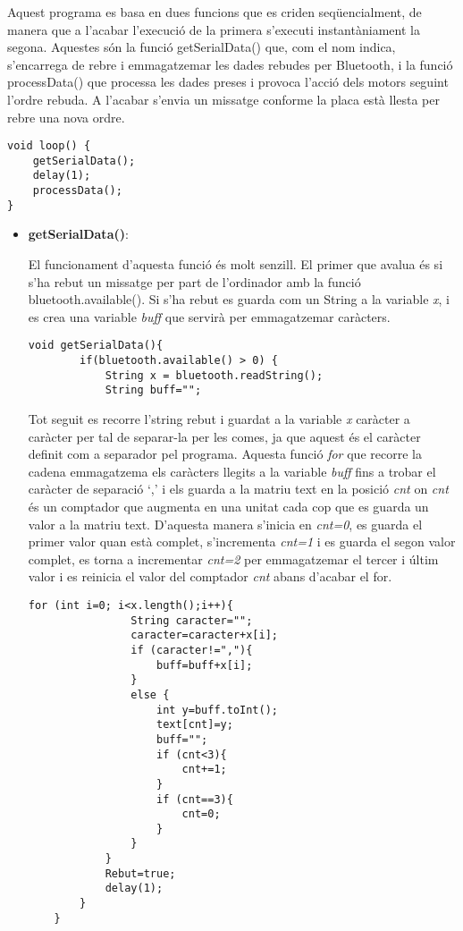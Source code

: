 Aquest programa es basa en dues funcions que es criden seqüencialment, de manera que a l'acabar l’execució de la primera s’executi instantàniament la segona. Aquestes són la funció getSerialData() que, com el nom indica, s’encarrega de rebre i emmagatzemar les dades rebudes per Bluetooth, i la funció processData() que processa les dades preses i provoca l’acció dels motors seguint l’ordre rebuda. A l'acabar s’envia un missatge conforme la placa està llesta per rebre una nova ordre. 
\begin{lstlisting}[style=Arduino]
void loop() {
	getSerialData();
	delay(1);
	processData();
}
\end{lstlisting}
\begin{itemize}
	\item \textbf{getSerialData()}:
	
	El funcionament d’aquesta funció és molt senzill. El primer que avalua és si s’ha rebut un missatge per part de l’ordinador amb la funció bluetooth.available(). Si s’ha rebut es guarda com un String a la variable \emph{x}, i es crea una variable \emph{buff} que servirà per emmagatzemar caràcters. 
	
	\begin{lstlisting}[style=Arduino]
	void getSerialData(){
		if(bluetooth.available() > 0) {
			String x = bluetooth.readString();
			String buff="";
	\end{lstlisting}
	
	Tot seguit es recorre l’string rebut i guardat a la variable \emph{x} caràcter a caràcter per tal de separar-la per les comes, ja que aquest és el caràcter definit com a separador pel programa. Aquesta funció \emph{for} que recorre la cadena emmagatzema els caràcters llegits a la variable \emph{buff} fins a trobar el caràcter de separació ‘,’ i els guarda a la matriu text en la posició \emph{cnt} on \emph{cnt} és un comptador que augmenta en una unitat cada cop que es guarda un valor a la matriu text. D’aquesta manera s’inicia en \emph{cnt=0}, es guarda el primer valor quan està complet, s’incrementa \emph{cnt=1} i es guarda el segon valor complet, es torna a incrementar \emph{cnt=2} per emmagatzemar el tercer i últim valor i es reinicia el valor del comptador \emph{cnt} abans d’acabar el for. 
	
	\begin{lstlisting}[style=Arduino]
			for (int i=0; i<x.length();i++){
				String caracter="";
				caracter=caracter+x[i];
				if (caracter!=","){
					buff=buff+x[i];
				}
				else {
					int y=buff.toInt();
					text[cnt]=y;
					buff="";
					if (cnt<3){
						cnt+=1;
					}
					if (cnt==3){
						cnt=0;
					}
				}
			}
			Rebut=true;
			delay(1);    
		}
	}
	\end{lstlisting}
	

\end{itemize}
